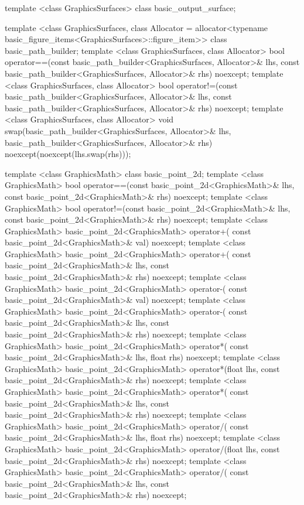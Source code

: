 \begin{codeblock}
{{    template <class GraphicsSurfaces>
    class basic_output_surface;
    
    template <class GraphicsSurfaces, class Allocator =
      allocator<typename basic_figure_items<GraphicsSurfaces>::figure_item>>
    class basic_path_builder;
    template <class GraphicsSurfaces, class Allocator>
    bool operator==(const basic_path_builder<GraphicsSurfaces, Allocator>& lhs,
      const basic_path_builder<GraphicsSurfaces, Allocator>& rhs) noexcept;
    template <class GraphicsSurfaces, class Allocator>
    bool operator!=(const basic_path_builder<GraphicsSurfaces, Allocator>& lhs,
      const basic_path_builder<GraphicsSurfaces, Allocator>& rhs) noexcept;
    template <class GraphicsSurfaces, class Allocator>
    void swap(basic_path_builder<GraphicsSurfaces, Allocator>& lhs,
      basic_path_builder<GraphicsSurfaces, Allocator>& rhs) noexcept(noexcept(lhs.swap(rhs)));
      
    template <class GraphicsMath>
    class basic_point_2d;
    template <class GraphicsMath>
    bool operator==(const basic_point_2d<GraphicsMath>& lhs,
      const basic_point_2d<GraphicsMath>& rhs) noexcept;
    template <class GraphicsMath>
    bool operator!=(const basic_point_2d<GraphicsMath>& lhs,
      const basic_point_2d<GraphicsMath>& rhs) noexcept;
    template <class GraphicsMath>
    basic_point_2d<GraphicsMath> operator+(
      const basic_point_2d<GraphicsMath>& val) noexcept;
    template <class GraphicsMath>
    basic_point_2d<GraphicsMath> operator+(
      const basic_point_2d<GraphicsMath>& lhs,
      const basic_point_2d<GraphicsMath>& rhs) noexcept;
    template <class GraphicsMath>
    basic_point_2d<GraphicsMath> operator-(
      const basic_point_2d<GraphicsMath>& val) noexcept;
    template <class GraphicsMath>
    basic_point_2d<GraphicsMath> operator-(
      const basic_point_2d<GraphicsMath>& lhs,
      const basic_point_2d<GraphicsMath>& rhs) noexcept;
    template <class GraphicsMath>
    basic_point_2d<GraphicsMath> operator*(
      const basic_point_2d<GraphicsMath>& lhs,
      float rhs) noexcept;
    template <class GraphicsMath>
    basic_point_2d<GraphicsMath> operator*(float lhs,
      const basic_point_2d<GraphicsMath>& rhs) noexcept;
    template <class GraphicsMath>
    basic_point_2d<GraphicsMath> operator*(
      const basic_point_2d<GraphicsMath>& lhs,
      const basic_point_2d<GraphicsMath>& rhs) noexcept;
    template <class GraphicsMath>
    basic_point_2d<GraphicsMath> operator/(
      const basic_point_2d<GraphicsMath>& lhs,
      float rhs) noexcept;
    template <class GraphicsMath>
    basic_point_2d<GraphicsMath> operator/(float lhs,
      const basic_point_2d<GraphicsMath>& rhs) noexcept;
    template <class GraphicsMath>
    basic_point_2d<GraphicsMath> operator/(
      const basic_point_2d<GraphicsMath>& lhs,
      const basic_point_2d<GraphicsMath>& rhs) noexcept;
  
}}
\end{codeblock}

